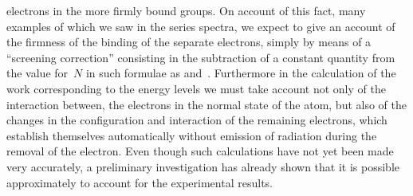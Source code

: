 electrons in the more firmly bound groups. On account of this
fact, many examples of which we saw in the series spectra, we 
expect to give an account of the firmness of the binding of the
separate electrons, simply by means of a ``screening correction''
consisting in the subtraction of a constant quantity from the value
for~$N$ in such formulae as  and~. Furthermore in the calculation
of the work corresponding to the energy levels we must take
account not only of the interaction between, the electrons in the
normal state of the atom, but also of the changes in the configuration
and interaction of the remaining electrons, which establish
themselves automatically without emission of radiation during the
removal of the electron. Even though such calculations have not
yet been made very accurately, a preliminary investigation has
already shown that it is possible approximately to account for the
experimental results.

